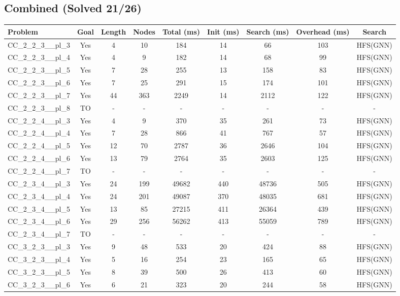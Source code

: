 \documentclass{article}
\begin{document}
\subsection*{Combined (Solved 21/26)}
\begin{tabular}{lcccccccc}
\toprule
Problem & Goal & Length & Nodes & Total (ms) & Init (ms) & Search (ms) & Overhead (ms) & Search \\
\midrule
CC\_2\_2\_3\_\_pl\_3 & Yes & 4 & 10 & 184 & 14 & 66 & 103 & HFS(GNN) \\
CC\_2\_2\_3\_\_pl\_4 & Yes & 4 & 9 & 182 & 14 & 68 & 99 & HFS(GNN) \\
CC\_2\_2\_3\_\_pl\_5 & Yes & 7 & 28 & 255 & 13 & 158 & 83 & HFS(GNN) \\
CC\_2\_2\_3\_\_pl\_6 & Yes & 7 & 25 & 291 & 15 & 174 & 101 & HFS(GNN) \\
CC\_2\_2\_3\_\_pl\_7 & Yes & 44 & 363 & 2249 & 14 & 2112 & 122 & HFS(GNN) \\
CC\_2\_2\_3\_\_pl\_8 & TO & - & - & - & - & - & - & - \\
CC\_2\_2\_4\_\_pl\_3 & Yes & 4 & 9 & 370 & 35 & 261 & 73 & HFS(GNN) \\
CC\_2\_2\_4\_\_pl\_4 & Yes & 7 & 28 & 866 & 41 & 767 & 57 & HFS(GNN) \\
CC\_2\_2\_4\_\_pl\_5 & Yes & 12 & 70 & 2787 & 36 & 2646 & 104 & HFS(GNN) \\
CC\_2\_2\_4\_\_pl\_6 & Yes & 13 & 79 & 2764 & 35 & 2603 & 125 & HFS(GNN) \\
CC\_2\_2\_4\_\_pl\_7 & TO & - & - & - & - & - & - & - \\
CC\_2\_3\_4\_\_pl\_3 & Yes & 24 & 199 & 49682 & 440 & 48736 & 505 & HFS(GNN) \\
CC\_2\_3\_4\_\_pl\_4 & Yes & 24 & 201 & 49087 & 370 & 48035 & 681 & HFS(GNN) \\
CC\_2\_3\_4\_\_pl\_5 & Yes & 13 & 85 & 27215 & 411 & 26364 & 439 & HFS(GNN) \\
CC\_2\_3\_4\_\_pl\_6 & Yes & 29 & 256 & 56262 & 413 & 55059 & 789 & HFS(GNN) \\
CC\_2\_3\_4\_\_pl\_7 & TO & - & - & - & - & - & - & - \\
CC\_3\_2\_3\_\_pl\_3 & Yes & 9 & 48 & 533 & 20 & 424 & 88 & HFS(GNN) \\
CC\_3\_2\_3\_\_pl\_4 & Yes & 5 & 16 & 254 & 23 & 165 & 65 & HFS(GNN) \\
CC\_3\_2\_3\_\_pl\_5 & Yes & 8 & 39 & 500 & 26 & 413 & 60 & HFS(GNN) \\
CC\_3\_2\_3\_\_pl\_6 & Yes & 6 & 21 & 323 & 20 & 244 & 58 & HFS(GNN) \\

\end{tabular}
\end{document}
